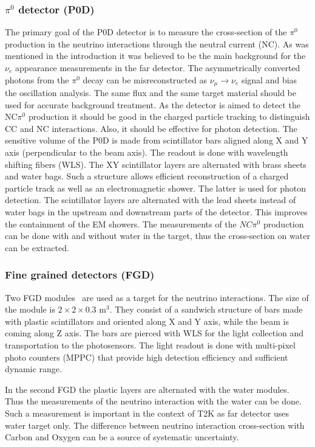 \documentclass[../main.tex]{subfiles}
\begin{document}
\subsubsection{$\pi^0$ detector (P0D)}
\label{sec:t2k:pod}
The primary goal of the P0D detector is to measure the cross-section of the $\pi^0$ production in the neutrino interactions through the neutral current (NC). As was mentioned in the introduction it was believed to be the main background for the $\nu_e$ appearance measurements in the far detector. The asymmetrically converted photons from the $\pi^0$ decay can be misreconstructed as $\nu_\mu\to\nu_e$ signal and bias the oscillation analysis. The same flux and the same target material should be used for accurate background treatment. As the detector is aimed to detect the NC$\pi^0$ production it should be good in the charged particle tracking to distinguish CC and NC interactions. Also, it should be effective for photon detection. The sensitive volume of the P0D is made from scintillator bars aligned along X and Y axis (perpendicular to the beam axis). The readout is done with wavelength shifting fibers (WLS). The XY scintillator layers are alternated with brass sheets and water bags. Such a structure allows efficient reconstruction of a charged particle track as well as an electromagnetic shower. The latter is used for photon detection. The scintillator layers are alternated with the lead sheets instead of water bags in the upstream and downstream parts of the detector. This improves the containment of the EM showers. The measurements of the $NC\pi^0$ production can be done with and without water in the target, thus the cross-section on water can be extracted.

\subsubsection{Fine grained detectors (FGD)}
Two FGD modules~\cite{Amaudruz2012} are used as a target for the neutrino interactions. The size of the module is $2\times2\times0.3$ $\text{m}^3$. They consist of a sandwich structure of bars made with plastic scintillators and oriented along X and Y axis, while the beam is coming along Z axis. The bars are pierced with WLS for the light collection and transportation to the photosensors. The light readout is done with multi-pixel photo counters (MPPC) that provide high detection efficiency and sufficient dynamic range.

In the second FGD the plastic layers are alternated with the water modules. Thus the measurements of the neutrino interaction with the water can be done. Such a measurement is important in the context of T2K as far detector uses water target only. The difference between neutrino interaction cross-section with Carbon and Oxygen can be a source of systematic uncertainty.
\end{document}
